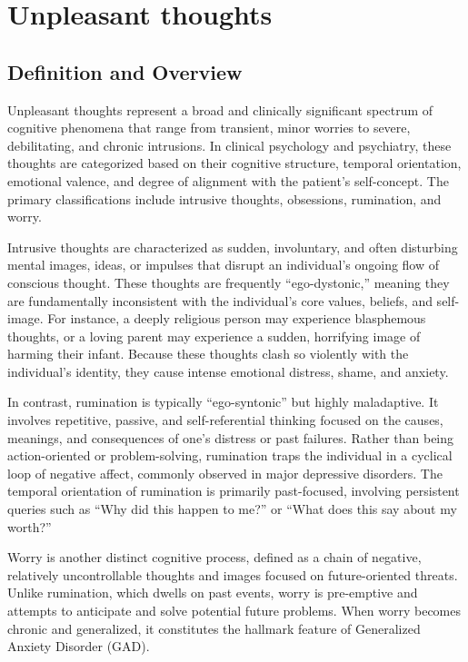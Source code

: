 \chapter{Unpleasant thoughts}

\section*{Definition and Overview}
Unpleasant thoughts represent a broad and clinically significant spectrum of cognitive phenomena that range from transient, minor worries to severe, debilitating, and chronic intrusions. In clinical psychology and psychiatry, these thoughts are categorized based on their cognitive structure, temporal orientation, emotional valence, and degree of alignment with the patient's self-concept. The primary classifications include intrusive thoughts, obsessions, rumination, and worry.

Intrusive thoughts are characterized as sudden, involuntary, and often disturbing mental images, ideas, or impulses that disrupt an individual's ongoing flow of conscious thought. These thoughts are frequently ``ego-dystonic,'' meaning they are fundamentally inconsistent with the individual's core values, beliefs, and self-image. For instance, a deeply religious person may experience blasphemous thoughts, or a loving parent may experience a sudden, horrifying image of harming their infant. Because these thoughts clash so violently with the individual's identity, they cause intense emotional distress, shame, and anxiety.

In contrast, rumination is typically ``ego-syntonic'' but highly maladaptive. It involves repetitive, passive, and self-referential thinking focused on the causes, meanings, and consequences of one's distress or past failures. Rather than being action-oriented or problem-solving, rumination traps the individual in a cyclical loop of negative affect, commonly observed in major depressive disorders. The temporal orientation of rumination is primarily past-focused, involving persistent queries such as ``Why did this happen to me?'' or ``What does this say about my worth?''

Worry is another distinct cognitive process, defined as a chain of negative, relatively uncontrollable thoughts and images focused on future-oriented threats. Unlike rumination, which dwells on past events, worry is pre-emptive and attempts to anticipate and solve potential future problems. When worry becomes chronic and generalized, it constitutes the hallmark feature of Generalized Anxiety Disorder (GAD).

